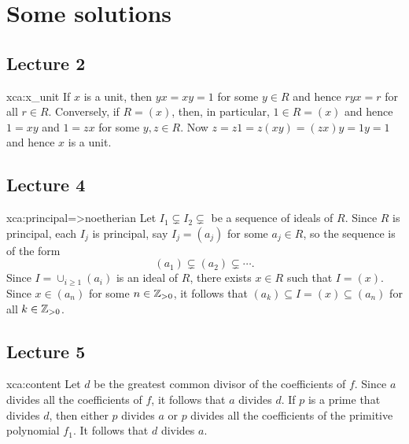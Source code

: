 \chapter{Some solutions}

\section*{Lecture 2}

\begin{sol}{xca:x_unit}
If $x$ is a unit, then $yx=xy=1$ for some $y\in R$ and hence $ryx=r$ for all $r\in R$. Conversely, 
if $R=(x)$, then, in particular, $1\in R=(x)$ and hence $1=xy$ and $1=zx$ for some $y,z\in R$. Now
$z=z1=z(xy)=(zx)y=1y=1$ and hence $x$ is a unit. 
\end{sol}

\section*{Lecture 4}

\begin{sol}{xca:principal=>noetherian}
	Let $I_1\subsetneq I_2\subsetneq$ be a sequence of ideals of $R$.  
	Since $R$ is principal, each $I_j$ is principal, 
	say $I_j=(a_j)$ for some $a_j\in R$, so the sequence is of the form
	\[
	(a_1)\subsetneq (a_2)\subsetneq\cdots.
	\]
	Since $I=\cup_{i\geq1}(a_i)$ is an ideal of $R$, 
	there exists $x\in R$ such that $I=(x)$. Since $x\in (a_n)$ for some $n\in\mathbb{Z}_{>0}$, 
	it follows that $(a_k)\subseteq I=(x)\subseteq (a_n)$ for all $k\in\mathbb{Z}_{>0}$. 
\end{sol}
	
\section*{Lecture 5}


\begin{sol}{xca:content}
	Let $d$ be 
	the greatest common divisor
	of the coefficients of $f$. 
	Since $a$ divides all the coefficients of $f$, it follows that $a$ divides $d$. If $p$ is a prime that
	divides $d$, then either $p$ divides $a$ or $p$ divides all the coefficients of the primitive
	polynomial $f_1$. It follows that $d$ divides $a$.    
\end{sol}

